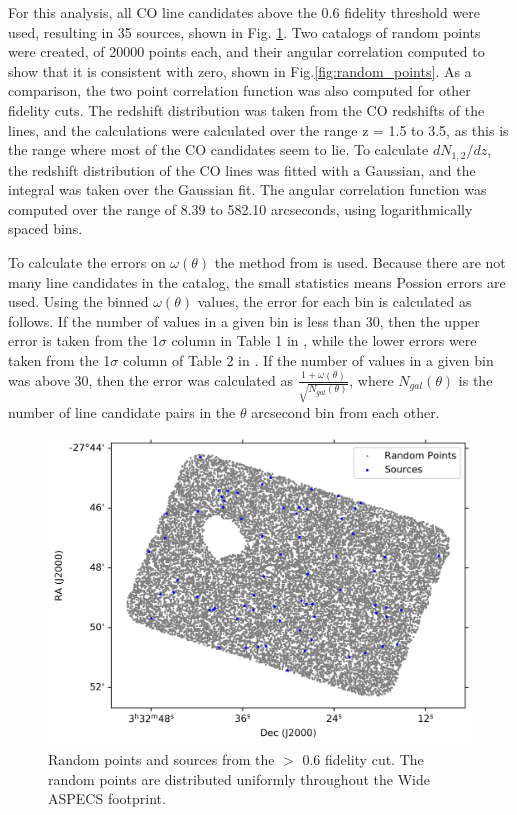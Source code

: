 For this analysis, all CO line candidates above the 0.6 fidelity threshold were used, resulting in 35 sources, shown in Fig. \ref{fig:Clustering_points}. Two catalogs of random points were created, of 20000 points each, and their angular correlation computed to show that it is consistent with zero, shown in Fig.\ref{fig:random_points}. As a comparison, the two point correlation function was also computed for other fidelity cuts. The redshift distribution was taken from the CO redshifts of the lines, and the calculations were calculated over the range z = 1.5 to 3.5, as this is the range where most of the CO candidates seem to lie. To calculate $dN_{1,2}/dz$, the redshift distribution of the CO lines was fitted with a Gaussian, and the integral was taken over the Gaussian fit. The angular correlation function was computed over the range of 8.39 to 582.10 arcseconds, using logarithmically spaced bins. 

To calculate the errors on $\omega(\theta)$ the method from \cite{1986ApJ...303..336G} is used. Because there are not many line candidates in the catalog, the small statistics means Possion errors are used. Using the binned $\omega(\theta)$ values, the error for each bin is calculated as follows. If the number of values in a given bin is less than 30, then the upper error is taken from  the 1$\sigma$ column in Table 1 in \cite{1986ApJ...303..336G}, while the lower errors were taken from the 1$\sigma$ column of Table 2 in \cite{1986ApJ...303..336G}. If the number of values in a given bin was above 30, then the error was calculated as $ \frac{1 + \omega(\theta)}{\sqrt{N_{gal}(\theta)}}$, where $N_{gal}(\theta)$ is the number of line candidate pairs in the $\theta$ arcsecond bin from each other. 


\begin{figure}[tbp]
\centering \includegraphics[width=120mm]{PDFS/NX_V_Y_Sources_20000.png}
\caption{Random points and sources from the $>$ 0.6 fidelity cut. The random points are distributed uniformly throughout the Wide ASPECS footprint.}
\label{fig:Clustering_points}
\end{figure}

